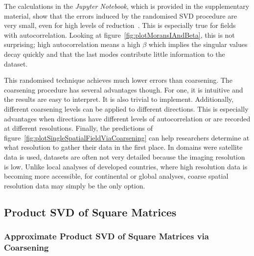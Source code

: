\documentclass[ijgi,article,submit,moreauthors,pdftex,10pt,a4paper]{Definitions/mdpi}
\begin{document}
The calculations in the \textit{Jupyter Notebook}, which is provided in the supplementary material, show that the errors induced by the randomised SVD procedure are very small, even for high levels of reduction~\cite{Bogaardt2018}. This is especially true for fields with autocorrelation. Looking at figure~\ref{fig:plotMoransIAndBeta}, this is not surprising; high autocorrelation means a high $\beta$ which implies the singular values decay quickly and that the last modes contribute little information to the dataset.

This randomised technique achieves much lower errors than coarsening. The coarsening procedure has several advantages though. For one, it is intuitive and the results are easy to interpret. It is also trivial to implement. Additionally, different coarsening levels can be applied to different directions. This is especially advantages when directions have different levels of autocorrelation or are recorded at different resolutions. Finally, the predictions of figure~\ref{fig:plotSingleSpatialFieldViaCoarsening} can help researchers determine at what resolution to gather their data in the first place. In domains were satellite data is used, datasets are often not very detailed because the imaging resolution is low. Unlike local analyses of developed countries, where high resolution data is becoming more accessible, for continental or global analyses, coarse spatial resolution data may simply be the only option.
\subsection{Product SVD of Square Matrices}
\label{sec:Results/Product SVD of Square Matrices}
\subsubsection{Approximate Product SVD of Square Matrices via Coarsening}
\label{sec:Results/Approximate Product SVD of Square Matrices via Coarsening}
\end{document}
